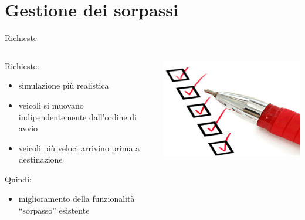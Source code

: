 %
%
\section{Gestione dei sorpassi}
\begin{frame}{Richieste}
	\begin{columns}
		\begin{column}{0.8\textwidth}
			Richieste:
			\begin{itemize}
				\item{\footnotesize{simulazione più realistica}}
				\item{\footnotesize{veicoli si muovano indipendentemente dall'ordine di avvio}}
				\item{\footnotesize{veicoli più veloci arrivino prima a destinazione}}
			\end{itemize}
			Quindi:
			\begin{itemize}
				\item{\footnotesize{miglioramento della funzionalità ``sorpasso'' esistente}}
			\end{itemize}
		\end{column}
		\begin{column}{0.2\textwidth}
			\includegraphics[scale=0.25]{images/requirement.png}
		\end{column}
	\end{columns}
\end{frame}

